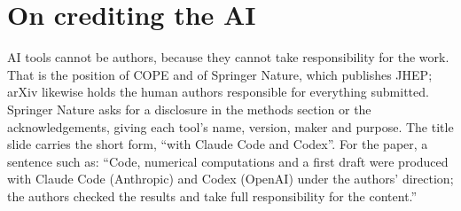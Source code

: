 \documentclass[12pt,a4paper]{article}
\begin{document}
\section*{On crediting the AI}

AI tools cannot be authors, because they cannot take responsibility for the work.
That is the position of COPE and of Springer Nature, which publishes JHEP; arXiv
likewise holds the human authors responsible for everything submitted. Springer
Nature asks for a disclosure in the methods section or the acknowledgements, giving
each tool's name, version, maker and purpose. The
title slide carries the short form, ``with Claude Code and Codex''. For the paper, a sentence such as:
``Code, numerical computations and a first draft were produced with Claude Code
(Anthropic) and Codex (OpenAI) under the authors' direction; the authors checked
the results and take full responsibility for the content.''
\end{document}
